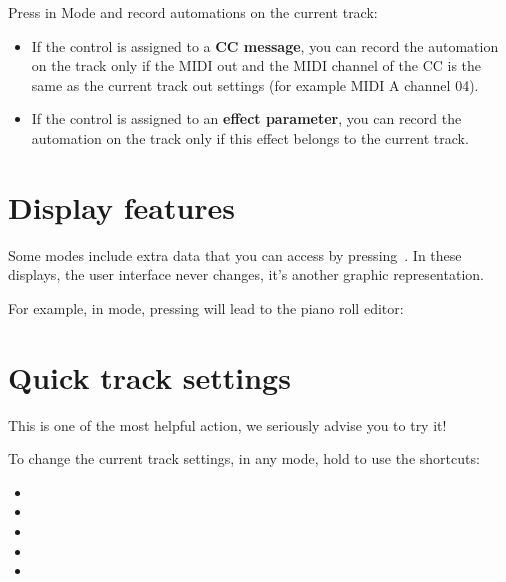 
Press  in  Mode and record automations on the current track:

\begin{itemize}
\item If the control is assigned to a \textbf{CC message}, you can record the automation on the track only if the MIDI out and the MIDI channel of the CC is the same as the current track out settings (for example MIDI A channel 04).
\item If the control is assigned to an \textbf{effect parameter}, you can record the automation on the track only if this effect belongs to the current track.
\end{itemize}



\section{Display features}

Some modes include extra data that you can access by pressing . In these displays, the user interface never changes, it's another graphic representation.

For example, in  mode, pressing  will lead to the piano roll editor:




\section{Quick track settings}

This is one of the most helpful action, we seriously advise you to try it!

To change the current track settings, in any mode, hold  to use the shortcuts:

\begin{itemize}
\item {}
\item {}
\item {}
\item {}
\item {}
\end{itemize}

